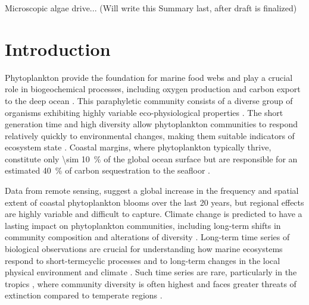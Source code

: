 \documentclass[draft]{agujournal2019}
\begin{document}
Microscopic algae drive... (Will write this Summary last, after draft is finalized) 





\section{Introduction}
%


    Phytoplankton provide the foundation for marine food webs and play a crucial role in biogeochemical processes, including oxygen production and carbon export to the deep ocean \cite{falkowski_biogeochemical_1998}. This paraphyletic community consists of a diverse group of organisms  exhibiting highly variable eco-physiological properties \cite{appeltans_magnitude_2012}. The short generation time and high diversity allow phytoplankton communities to respond relatively quickly to environmental changes, making them suitable indicators of ecosystem state \cite{alvarez-cobelas_what_1998, barton_anthropogenic_2016, di_cavalho_temporal_2023}.
    Coastal margins, where phytoplankton typically thrive, constitute only \qty{\sim 10}{\%} of the global ocean surface  but are responsible for an estimated \qty{40}{\%} of carbon sequestration to the seafloor \cite{yool_examination_2001, mullerkarger_importance_2005}. 

    
    Data from remote sensing, suggest a global increase in the frequency and spatial extent of coastal phytoplankton blooms over the last 20 years, but regional effects are highly variable \cite{dai_coastal_2023} and difficult to capture.
    Climate change is predicted to have a lasting impact on phytoplankton communities, including long-term shifts in community composition and alterations of diversity \cite{acevedo-trejos_glimpse_2014, boyd_biological_2016, henson_future_2021}. 
    Long-term time series of biological observations are crucial for understanding how marine ecosystems respond to short-termcyclic processes and to long-term changes in the local physical environment and climate \cite{carstensen_need_2014, henson_observing_2016}. Such time series are rare, particularly in the tropics \cite{clarke_does_2017}, where community diversity is often highest \cite{brown_why_2014, righetti_global_2019} and faces greater threats of extinction compared to temperate regions \cite{finnegan_paleontological_2015}. 
\end{document}
